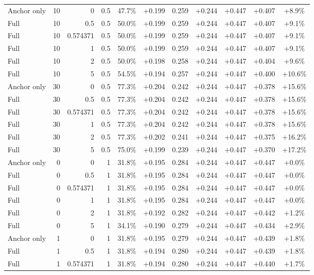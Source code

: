 \begin{table}[htbp]
\begin{tabular}{lrrrccccccc}
Anchor only & 10 & 0 & 0.5 & 47.7\% & +0.199 & 0.259 & +0.244 & +0.447 & +0.407 & +8.9\% \\
Full & 10 & 0.5 & 0.5 & 50.0\% & +0.199 & 0.259 & +0.244 & +0.447 & +0.407 & +9.1\% \\
Full & 10 & 0.574371 & 0.5 & 50.0\% & +0.199 & 0.259 & +0.244 & +0.447 & +0.407 & +9.1\% \\
Full & 10 & 1 & 0.5 & 50.0\% & +0.199 & 0.259 & +0.244 & +0.447 & +0.407 & +9.1\% \\
Full & 10 & 2 & 0.5 & 50.0\% & +0.198 & 0.258 & +0.244 & +0.447 & +0.404 & +9.6\% \\
Full & 10 & 5 & 0.5 & 54.5\% & +0.194 & 0.257 & +0.244 & +0.447 & +0.400 & +10.6\% \\
Anchor only & 30 & 0 & 0.5 & 77.3\% & +0.204 & 0.242 & +0.244 & +0.447 & +0.378 & +15.6\% \\
Full & 30 & 0.5 & 0.5 & 77.3\% & +0.204 & 0.242 & +0.244 & +0.447 & +0.378 & +15.6\% \\
Full & 30 & 0.574371 & 0.5 & 77.3\% & +0.204 & 0.242 & +0.244 & +0.447 & +0.378 & +15.6\% \\
Full & 30 & 1 & 0.5 & 77.3\% & +0.204 & 0.242 & +0.244 & +0.447 & +0.378 & +15.6\% \\
Full & 30 & 2 & 0.5 & 77.3\% & +0.202 & 0.241 & +0.244 & +0.447 & +0.375 & +16.2\% \\
Full & 30 & 5 & 0.5 & 75.0\% & +0.199 & 0.239 & +0.244 & +0.447 & +0.370 & +17.2\% \\
Anchor only & 0 & 0 & 1 & 31.8\% & +0.195 & 0.284 & +0.244 & +0.447 & +0.447 & +0.0\% \\
Full & 0 & 0.5 & 1 & 31.8\% & +0.195 & 0.284 & +0.244 & +0.447 & +0.447 & +0.0\% \\
Full & 0 & 0.574371 & 1 & 31.8\% & +0.195 & 0.284 & +0.244 & +0.447 & +0.447 & +0.0\% \\
Full & 0 & 1 & 1 & 31.8\% & +0.195 & 0.284 & +0.244 & +0.447 & +0.447 & +0.0\% \\
Full & 0 & 2 & 1 & 31.8\% & +0.192 & 0.282 & +0.244 & +0.447 & +0.442 & +1.2\% \\
Full & 0 & 5 & 1 & 34.1\% & +0.190 & 0.279 & +0.244 & +0.447 & +0.434 & +2.9\% \\
Anchor only & 1 & 0 & 1 & 31.8\% & +0.195 & 0.279 & +0.244 & +0.447 & +0.439 & +1.8\% \\
Full & 1 & 0.5 & 1 & 31.8\% & +0.194 & 0.280 & +0.244 & +0.447 & +0.439 & +1.8\% \\
Full & 1 & 0.574371 & 1 & 31.8\% & +0.194 & 0.280 & +0.244 & +0.447 & +0.440 & +1.7\% \\

\end{tabular}
\end{table}
